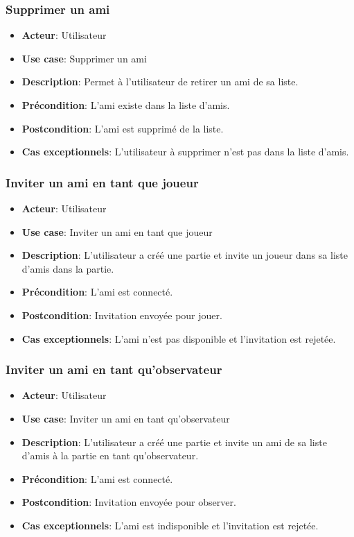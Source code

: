 \documentclass{article}
\begin{document}
\subsubsection*{Supprimer un ami}
\begin{itemize}
    \item \textbf{Acteur}: Utilisateur
    \item \textbf{Use case}: Supprimer un ami
    \item \textbf{Description}: Permet à l'utilisateur de retirer un ami de sa liste.
    \item \textbf{Précondition}: L'ami existe dans la liste d'amis.
    \item \textbf{Postcondition}: L'ami est supprimé de la liste.
    \item \textbf{Cas exceptionnels}: L'utilisateur à supprimer n'est pas dans la liste d'amis.
\end{itemize}

\subsubsection*{Inviter un ami en tant que joueur}
\begin{itemize}
    \item \textbf{Acteur}: Utilisateur
    \item \textbf{Use case}: Inviter un ami en tant que joueur
    \item \textbf{Description}: L'utilisateur a créé une partie et invite un joueur dans sa liste d'amis dans la partie.
    \item \textbf{Précondition}: L'ami est connecté.
    \item \textbf{Postcondition}: Invitation envoyée pour jouer.
    \item \textbf{Cas exceptionnels}: L'ami n'est pas disponible et l'invitation est rejetée.
\end{itemize}

\subsubsection*{Inviter un ami en tant qu'observateur}
\begin{itemize}
    \item \textbf{Acteur}: Utilisateur
    \item \textbf{Use case}: Inviter un ami en tant qu'observateur
    \item \textbf{Description}: L'utilisateur a créé une partie et invite un ami de sa liste d'amis à la partie en tant qu'observateur.
    \item \textbf{Précondition}: L'ami est connecté.
    \item \textbf{Postcondition}: Invitation envoyée pour observer.
    \item \textbf{Cas exceptionnels}: L'ami est indisponible et l'invitation est rejetée.
\end{itemize}
\end{document}
